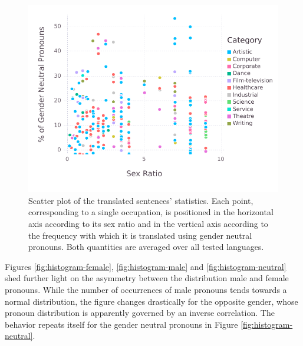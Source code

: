 \documentclass[jair,twoside,11pt,theapa]{article}
\begin{document}
\begin{figure}[H]
  \centering
  \includegraphics[width=\linewidth]{pictures/scatterplot-languages}
  \caption{Scatter plot of the translated sentences' statistics. Each point, corresponding to a single occupation, is positioned in the horizontal axis according to its sex ratio and in the vertical axis according to the frequency with which it is translated using gender neutral pronouns. Both quantities are averaged over all tested languages.}
  \label{fig:scatterplot-languages}
\end{figure}

Figures \ref{fig:histogram-female}, \ref{fig:histogram-male} and \ref{fig:histogram-neutral} shed further light on the asymmetry between the distribution male and female pronouns. While the number of occurrences of male pronouns tends towards a normal distribution, the figure changes drastically for the opposite gender, whose pronoun distribution is apparently governed by an inverse correlation. The behavior repeats itself for the gender neutral pronouns in Figure \ref{fig:histogram-neutral}.
\end{document}
